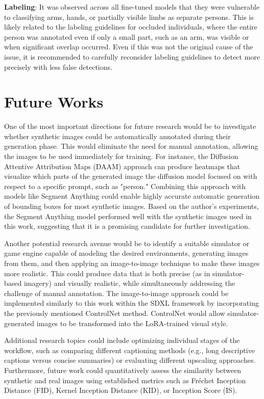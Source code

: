 \textbf{Labeling}: It was observed across all fine-tuned models that they were vulnerable to classifying arms, hands, or partially visible limbs as separate persons. This is likely related to the labeling guidelines for occluded individuals, where the entire person was annotated even if only a small part, such as an arm, was visible or when significant overlap occurred. Even if this was not the original cause of the issue, it is recommended to carefully reconsider labeling guidelines to detect more precisely with less false detections.


\section{Future Works}

One of the most important directions for future research would be to investigate whether synthetic images could be automatically annotated during their generation phase. This would eliminate the need for manual annotation, allowing the images to be used immediately for training. For instance, the Diffusion Attentive Attribution Maps (DAAM) \cite{tang2022daaminterpretingstablediffusion} approach can produce heatmaps that visualize which parts of the generated image the diffusion model focused on with respect to a specific prompt, such as "person." Combining this approach with models like Segment Anything \cite{kirillov2023segment} could enable highly accurate automatic generation of bounding boxes for most synthetic images. Based on the author's experiments, the Segment Anything model performed well with the synthetic images used in this work, suggesting that it is a promising candidate for further investigation.

Another potential research avenue would be to identify a suitable simulator or game engine capable of modeling the desired environments, generating images from them, and then applying an image-to-image technique to make these images more realistic. This could produce data that is both precise (as in simulator-based imagery) and visually realistic, while simultaneously addressing the challenge of manual annotation. The image-to-image approach could be implemented similarly to this work within the SDXL framework by incorporating the previously mentioned ControlNet method. ControlNet would allow simulator-generated images to be transformed into the LoRA-trained visual style.

Additional research topics could include optimizing individual stages of the workflow, such as comparing different captioning methods (e.g., long descriptive captions versus concise summaries) or evaluating different upscaling approaches. Furthermore, future work could quantitatively assess the similarity between synthetic and real images using established metrics such as Fréchet Inception Distance (FID), Kernel Inception Distance (KID), or Inception Score (IS).


